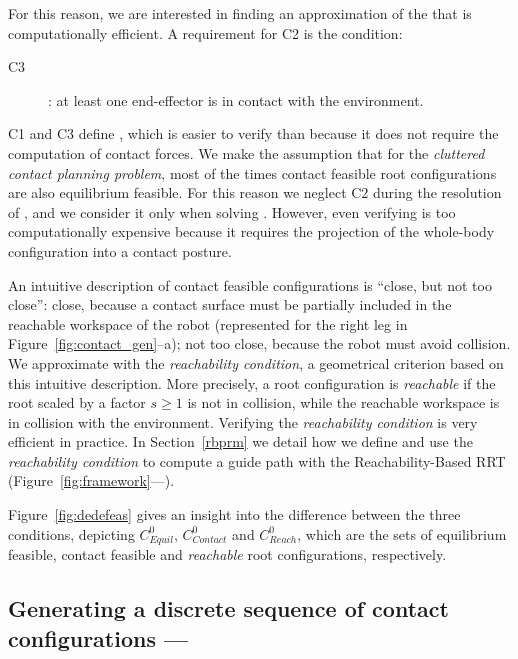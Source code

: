 For this reason, we are interested in finding an approximation of the  that is computationally efficient.
A requirement for C2 is the condition:
\begin{description}
\item[C3]: at least one end-effector is in contact with the environment.
\end{description}
C1 and C3 define , which is easier to verify than  because it does not require the computation of contact forces.
We make the assumption that for the \textit{\gls{cluttered} contact planning problem}, most of the times \gls{contact feasible} root configurations are also \gls{equilibrium feasible}.
For this reason we neglect C2 during the resolution of \Pa, and we consider it only when solving \Pb.
However, even verifying  is too computationally expensive because it requires the projection of the whole-body configuration into a contact posture.

An intuitive description of \gls{contact feasible} configurations is ``close, but not too close'': close, because a contact surface must be partially included in the reachable workspace of the robot (represented for the right leg in Figure~\ref{fig:contact_gen}--a); not too close, because the robot must avoid collision.
We approximate  with the \textit{reachability condition}, a geometrical criterion based on this intuitive description.
More precisely, a root configuration is \textit{reachable} if the root scaled by a factor $s \geq 1$ is not in collision, while the reachable workspace is in collision with the environment.
Verifying the \textit{reachability condition} is very efficient in practice.
In Section~\ref{rbprm} we detail how  we define and use the \textit{reachability condition} to compute a guide path with the Reachability-Based RRT (Figure~\ref{fig:framework}---\Pa).

Figure~\ref{fig:dedefeas} gives an insight into the difference between the three conditions, depicting $C_{Equil}^0$, $C_{Contact}^0$ and $C_{Reach}^0$, which are the sets of \gls{equilibrium feasible}, \gls{contact feasible} and \textit{reachable} root configurations, respectively.


\subsection{Generating a discrete sequence of contact configurations --- \Pb}

